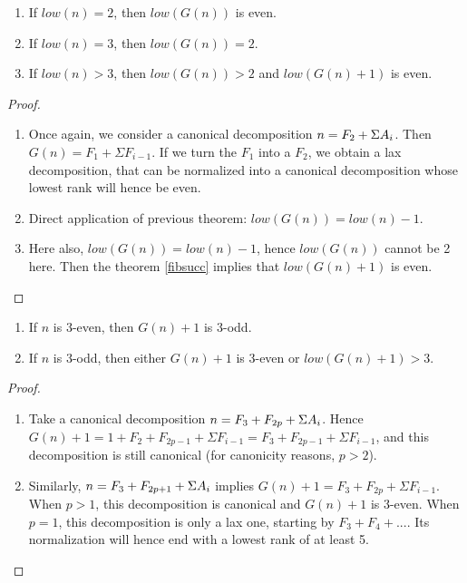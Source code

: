 \documentclass[a4paper,11pt]{article}
\begin{document}
\begin{theorem}\label{Gclass2}
\noindent
\begin{enumerate}
\item If $low(n)=2$, then $low(G(n))$ is even.
\item If $low(n)=3$, then $low(G(n))=2$.
\item If $low(n)>3$, then $low(G(n))>2$ and $low(G(n)+1)$ is even.
\end{enumerate}
\end{theorem}
\begin{proof}
\noindent
\begin{enumerate}
\item Once again, we consider a canonical decomposition
$n = F_2 + \Sigma A_i$. Then $G(n) = F_1 + \Sigma F_{i-1}$. If we
turn the $F_1$ into a $F_2$, we obtain a lax decomposition,
that can be normalized into a canonical decomposition whose
lowest rank will hence be even.
\item Direct application of previous theorem: $low(G(n))=low(n)-1$.
\item Here also, $low(G(n))=low(n)-1$, hence $low(G(n))$ cannot
be 2 here. Then the theorem \ref{fibsucc} implies that $low(G(n)+1)$ is even.
\end{enumerate}
\end{proof}

\begin{theorem}\label{Gthree}
\noindent
\begin{enumerate}
\item If $n$ is 3-even, then $G(n)+1$ is 3-odd.
\item If $n$ is 3-odd, then either $G(n)+1$ is 3-even or $low(G(n)+1)>3$.
\end{enumerate}
\end{theorem}
\begin{proof}
\noindent
\begin{enumerate}
\item Take a canonical decomposition $n=F_3+F_{2p}+\Sigma A_i$.
Hence $G(n)+1=1+F_2+F_{2p-1}+\Sigma F_{i-1}=F_3+F_{2p-1}+\Sigma F_{i-1}$,
and this decomposition is still canonical (for canonicity reasons,
$p>2$).
\item Similarly, $n=F_3+F_{2p+1}+\Sigma A_i$ implies
$G(n)+1=F_3+F_{2p}+\Sigma F_{i-1}$. When $p>1$, this decomposition
is canonical and $G(n)+1$ is 3-even. When $p=1$, this decomposition
is only a lax one, starting by $F_3+F_4+...$. Its normalization
will hence end with a lowest rank of at least 5.
\end{enumerate}
\end{proof}
\end{document}
